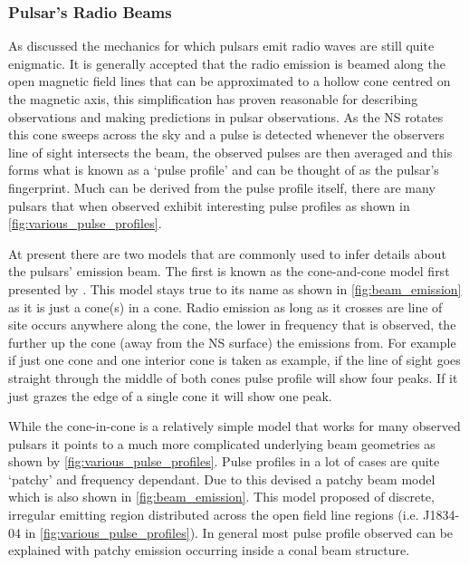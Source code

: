 

\subsubsection{Pulsar's Radio Beams}

As discussed the mechanics for which pulsars emit radio waves are still quite enigmatic. It is generally accepted that the radio emission is beamed along the open magnetic field lines that can be approximated to a hollow cone centred on the magnetic axis, this simplification has proven reasonable for describing observations and making predictions in pulsar observations. As the NS rotates this cone sweeps across the sky and a pulse is detected whenever the observers line of sight intersects the beam, the observed pulses are then averaged and this forms what is known as a `pulse profile' and can be thought of as the pulsar's fingerprint. Much can be derived from the pulse profile itself, there are many pulsars that when observed exhibit interesting pulse profiles as shown in \cref{fig:various_pulse_profiles}.  

At present there are two models that are commonly used to infer details about the pulsars' emission beam. The first  is known as the cone-and-cone model first presented by \cite{rankin_toward_1983}. This model stays true to its name as shown in \cref{fig:beam_emission} as it is just a cone(s) in a cone.  Radio emission as long as it crosses are line of site occurs anywhere along the cone, the lower in frequency that is observed, the further up the cone (away from the NS surface) the emissions from. For example if just one cone and one interior cone is taken as example, if the line of sight goes straight through the middle of both cones pulse profile will show four peaks. If it just grazes the edge of a single cone it will show one peak.   

While the cone-in-cone is a relatively simple model that works for many observed pulsars it points to a much more complicated underlying beam geometries as shown by \cref{fig:various_pulse_profiles}. Pulse profiles in a lot of cases are quite `patchy' and frequency dependant. Due to this \cite{lyne_shape_1988} devised a patchy beam model which is also shown in \cref{fig:beam_emission}. This model proposed of discrete, irregular emitting region distributed across the open field line regions (i.e. J1834-04 in \cref{fig:various_pulse_profiles}). In general most pulse profile observed can be explained with patchy emission occurring inside a conal beam structure. 

